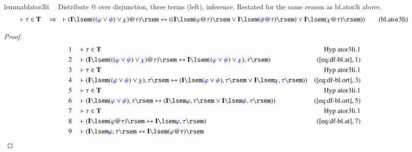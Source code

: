 \begin{restatable}{lemma}{blator3li}~~ Distribute @ over disjunction, three
terms (left), inference.  Restated for the same reason as bl.ator3i above.
\begin{align}
\vdash \tau \in \mathbf{T}\quad\Rightarrow\quad \vdash ( \mathbf{I} \lsem ( (
    ( \mw{\varphi} \vee \mw{\psi} ) \vee \mw{\chi} ) @ \tau ) \rsem
    \leftrightarrow ( ( \mathbf{I} \lsem ( \mw{\varphi} @ \tau ) \rsem \vee
    \mathbf{I} \lsem ( \mw{\psi} @ \tau ) \rsem ) \vee \mathbf{I} \lsem (
    \mw{\chi} @ \tau ) \rsem ) )\label{eq:bl.ator3li}\tag{bl.ator3li}
\end{align}
\end{restatable}

\begin{proof}
\begin{align}
  1 &&  & \vdash \tau \in
      \mathbf{T}&\text{Hyp~ator3li.1}\notag
  \\ 2 &&  & \vdash ( \mathbf{I} \lsem ( ( ( \mw{\varphi} \vee
      \mw{\psi} ) \vee \mw{\chi} ) @ \tau ) \rsem \leftrightarrow
      \mathbf{I} \lsem ( ( \mw{\varphi} \vee \mw{\psi} ) \vee \mw{\chi}
      ) , \tau \rsem )&(\mbox{\ref{eq:df-bl.at}},1)\notag
  \\ 3 &&  & \vdash \tau \in
      \mathbf{T}&\text{Hyp~ator3li.1}\notag
  \\ 4 &&  & \vdash ( \mathbf{I} \lsem ( ( \mw{\varphi} \vee \mw{\psi}
      ) \vee \mw{\chi} ) , \tau \rsem \leftrightarrow ( \mathbf{I}
      \lsem ( \mw{\varphi} \vee \mw{\psi} ) , \tau \rsem \vee
      \mathbf{I} \lsem \mw{\chi} , \tau \rsem )
      )&(\mbox{\ref{eq:df-bl.ort}},3)\notag
  \\ 5 &&  & \vdash \tau \in
      \mathbf{T}&\text{Hyp~ator3li.1}\notag
  \\ 6 &&  & \vdash ( \mathbf{I} \lsem ( \mw{\varphi} \vee \mw{\psi} )
      , \tau \rsem \leftrightarrow ( \mathbf{I} \lsem \mw{\varphi} ,
      \tau \rsem \vee \mathbf{I} \lsem \mw{\psi} , \tau \rsem )
      )&(\mbox{\ref{eq:df-bl.ort}},5)\notag
  \\ 7 &&  & \vdash \tau \in
      \mathbf{T}&\text{Hyp~ator3li.1}\notag
  \\ 8 &&  & \vdash ( \mathbf{I} \lsem ( \mw{\varphi} @ \tau ) \rsem
      \leftrightarrow \mathbf{I} \lsem \mw{\varphi} , \tau \rsem
      )&(\mbox{\ref{eq:df-bl.at}},7)\notag
  \\ 9 &&  & \vdash ( \mathbf{I} \lsem \mw{\varphi} , \tau \rsem
      \leftrightarrow \mathbf{I} \lsem ( \mw{\varphi} @ \tau ) \rsem

\end{align}
\end{proof}
